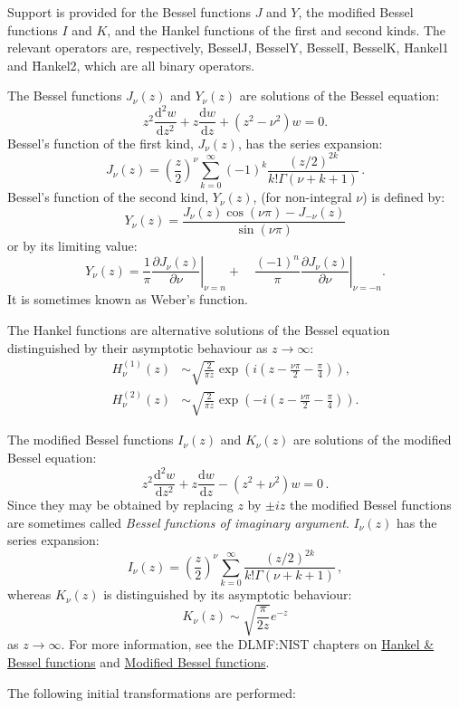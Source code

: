 Support is provided for the Bessel functions $J$ and $Y$, the modified
Bessel functions $I$ and $K$, and the Hankel functions of the first and
second kinds.  The relevant operators are, respectively, \f{BesselJ},
\f{BesselY}, \f{BesselI}, \f{BesselK}, \f{Hankel1} and \f{Hankel2},
which are all binary operators.

The Bessel functions $J_\nu(z)$ and $Y_\nu(z)$ are solutions of the Bessel
equation:
\[z^2\frac{\mathrm{d}^2w}{\mathrm{d}z^2}+z\frac{\mathrm{d}w}{\mathrm{d}z} +
(z^2 - \nu^2)w = 0.\]
Bessel's function of the first kind, $J_\nu(z)$, has the series expansion:
\[J_\nu(z) = \left(\frac{z}{2}\right)^\nu \sum_{k=0}^\infty (-1)^k
\frac{(z/2)^{2k}}{k! \Gamma(\nu + k+1)}\,.\]
Bessel's function of the second kind, $Y_\nu(z)$, (for non-integral $\nu$) is
defined by:
\[Y_\nu(z) = \frac{J_\nu(z) \cos(\nu\pi)-J_{-\nu}(z)}{\sin(\nu\pi)}\]
or by its limiting value:
\[Y_\nu(z) =
\left.\frac{1}{\pi}\frac{\partial{J_\nu(z)}}{\partial\nu}\right|_{\nu=n} +\quad
\left.\frac{(-1)^n}{\pi}\frac{\partial{J_\nu(z)}}{\partial \nu}\right|_{\nu=-n}. \]
It is sometimes known as Weber's function.

The Hankel functions are alternative solutions of the Bessel equation
distinguished by their asymptotic behaviour as $z\rightarrow \infty$:
\begin{align*}
H_\nu^{(1)}(z) & \sim \sqrt{\frac{2}{\pi z}}\exp\left(i\left(z-\frac{\nu\pi}
{2}-\frac{\pi}{4}\right)\right),\\
H_\nu^{(2)}(z) & \sim \sqrt{\frac{2}{\pi z}}\exp\left(-i\left(z-\frac{\nu\pi}
{2}-\frac{\pi}{4}\right)\right).
\end{align*}

The modified Bessel functions $I_\nu(z)$ and $K_\nu(z)$ are solutions of the
modified Bessel equation:
\[z^2\frac{\mathrm{d}^2w}{\mathrm{d}z^2}+z\frac{\mathrm{d}w}{\mathrm{d}z} -
(z^2 + \nu^2)w = 0\,.\]
Since they may be obtained by replacing $z$ by $\pm i z$ the modified Bessel
functions are sometimes called \emph{Bessel functions  of imaginary argument}.
$I_\nu(z)$ has the series expansion:
\[I_\nu(z) = \left(\frac{z}{2}\right)^\nu \sum_{k=0}^\infty \frac{(z/2)^{2k}}{k!\Gamma(\nu+k+1)}\,,\]
whereas $K_\nu(z)$ is distinguished by its asymptotic behaviour:
\[K_\nu(z) \sim \sqrt{\frac{\pi}{2 z}}e^{-z}\]
as $z\rightarrow \infty$. For more information, see the DLMF:NIST chapters on
\href{https://dlmf.nist.gov/10.2}{Hankel \& Bessel functions} and \href{https://dlmf.nist.gov/10.25}{Modified Bessel functions}.


The following initial transformations are performed:

